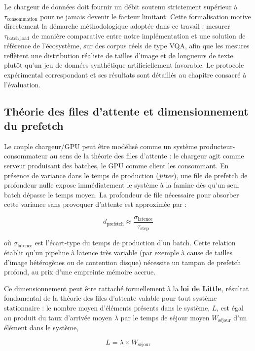 \documentclass[12pt,a4paper]{report}
\begin{document}
Le chargeur de données doit fournir un débit soutenu strictement supérieur à $\tau_{\text{consommation}}$ pour ne jamais devenir le facteur limitant. Cette formalisation motive directement la démarche méthodologique adoptée dans ce travail : mesurer $\tau_{\text{batch\_load}}$ de manière comparative entre notre implémentation et une solution de référence de l'écosystème, sur des corpus réels de type VQA, afin que les mesures reflètent une distribution réaliste de tailles d'image et de longueurs de texte plutôt qu'un jeu de données synthétique artificiellement favorable. Le protocole expérimental correspondant et ses résultats sont détaillés au chapitre consacré à l'évaluation.

\subsection{Théorie des files d'attente et dimensionnement du prefetch}

Le couple chargeur/GPU peut être modélisé comme un système producteur-consommateur au sens de la théorie des files d'attente : le chargeur agit comme serveur produisant des batches, le GPU comme client les consommant. En présence de variance dans le temps de production (\textit{jitter}), une file de prefetch de profondeur nulle expose immédiatement le système à la famine dès qu'un seul batch dépasse le temps moyen. La profondeur de file nécessaire pour absorber cette variance sans provoquer d'attente est approximée par :

\begin{equation}
\label{eq:prefetch_depth}
d_{\text{prefetch}} \approx \frac{\sigma_{\text{latence}}}{\tau_{\text{step}}}
\end{equation}

où $\sigma_{\text{latence}}$ est l'écart-type du temps de production d'un batch. Cette relation établit qu'un pipeline à latence très variable (par exemple à cause de tailles d'image hétérogènes ou de contention disque) nécessite un tampon de prefetch profond, au prix d'une empreinte mémoire accrue.

Ce dimensionnement peut être rattaché formellement à la \textbf{loi de Little}, résultat fondamental de la théorie des files d'attente valable pour tout système stationnaire : le nombre moyen d'éléments présents dans le système, $L$, est égal au produit du taux d'arrivée moyen $\lambda$ par le temps de séjour moyen $W_{\text{séjour}}$ d'un élément dans le système,

\begin{equation}
\label{eq:little}
L = \lambda \times W_{\text{séjour}}
\end{equation}
\end{document}
